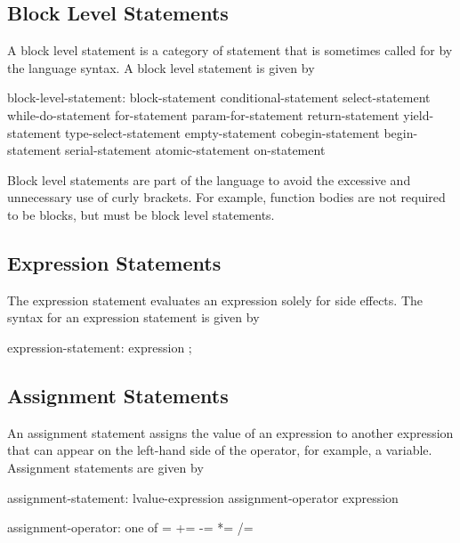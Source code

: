 \subsection{Block Level Statements}
\label{Block_Level_Statements}

A block level statement is a category of statement that is sometimes
called for by the language syntax. A block level statement is given by
\begin{syntax}
block-level-statement:
  block-statement
  conditional-statement
  select-statement
  while-do-statement
  for-statement
  param-for-statement
  return-statement
  yield-statement
  type-select-statement
  empty-statement
  cobegin-statement
  begin-statement
  serial-statement
  atomic-statement
  on-statement
\end{syntax}

Block level statements are part of the language to avoid the excessive
and unnecessary use of curly brackets.  For example, function bodies
are not required to be blocks, but must be block level statements.

\subsection{Expression Statements}
\label{Expression_Statements}

The expression statement evaluates an expression solely for side
effects. The syntax for an expression statement is given by
\begin{syntax}
expression-statement:
  expression ;
\end{syntax}

\subsection{Assignment Statements}
\label{Assignment_Statements}

An assignment statement assigns the value of an expression to another
expression that can appear on the left-hand side of the operator, for
example, a variable.  Assignment statements are given by

\begin{syntax}
assignment-statement:
  lvalue-expression assignment-operator expression

assignment-operator: one of
   = += -= *= /= %
\end{syntax}


